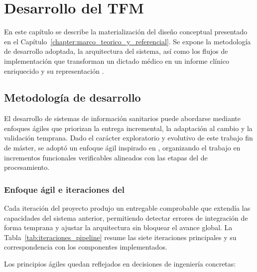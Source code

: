 \chapter{Desarrollo del TFM}\label{chapter:desarrollo}

En este capítulo se describe la materialización del diseño conceptual presentado en el
Capítulo~\ref{chapter:marco_teorico_y_referencial}. Se expone la metodología de desarrollo adoptada,
la arquitectura del sistema, así como los flujos de implementación que transforman un dictado médico
en un informe clínico enriquecido y su representación .

\section{Metodología de desarrollo}\label{section:metodologia_desarrollo}

El desarrollo de sistemas de información sanitarios puede abordarse mediante enfoques ágiles
que priorizan la entrega incremental, la adaptación al cambio y la validación temprana. 
Dado el carácter exploratorio y evolutivo de este trabajo fin de máster, se adoptó un enfoque
ágil inspirado en , organizando el trabajo en incrementos funcionales
verificables alineados con las etapas del  de procesamiento.

\subsection{Enfoque ágil e iteraciones del }\label{subsection:iteraciones_pipeline}

Cada iteración del proyecto produjo un entregable comprobable que extendía las capacidades del
sistema anterior, permitiendo detectar errores de integración de forma temprana y ajustar la
arquitectura sin bloquear el avance global. La Tabla~\ref{tab:iteraciones_pipeline} resume las
siete iteraciones principales y su correspondencia con los componentes implementados.



Los principios ágiles quedan reflejados en decisiones de ingeniería concretas:



